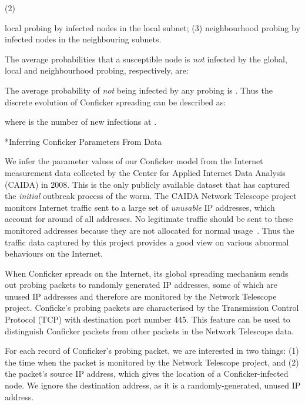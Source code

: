 \documentclass[9pt]{article}
\makeatletter
\renewcommand{\section}{\@startsection {section}{1}{0pt}{-6pt}{1pt}{\reset@font \large \bfseries}}
\makeatother
\begin{document}
(2) {local probing by  infected nodes in the local subnet; 
(3) {neighbourhood probing} by  infected nodes in the neighbouring subnets. 

The average probabilities that a susceptible node is \textit{not} infected by the global, local and neighbourhood probing, respectively, are: 

The average probability of \textit{not} being infected by any probing  is . Thus the discrete evolution of Conficker spreading can be described as: 

where  is the number of new infections at  .

\section*{Inferring Conficker Parameters From Data}

We infer the parameter values of our Conficker model from the Internet measurement data \cite{CAIDA_2008_aft, CAIDA_2008_bfr} collected by the Center for Applied Internet Data Analysis (CAIDA) in 2008. This is the only publicly available dataset that has captured the \textit{initial} outbreak process of the worm. The CAIDA Network Telescope project~\cite{CAIDA_2008_aft, CAIDA_2008_bfr} monitors Internet traffic sent to a large set of {\it unusable} IP addresses, which account for around  of all addresses.  No legitimate traffic should be sent to these monitored addresses because they are not allocated for normal usage~\cite{Emile_Aben_2009}. 
Thus the traffic data captured by this project provides a good view on various abnormal behaviours on the Internet.  

When Conficker spreads on the Internet, its global spreading mechanism sends out probing packets to randomly generated IP addresses, some of which are unused IP addresses and therefore are monitored by the Network Telescope project. 
Conficke's probing packets are characterised by the Transmission Control Protocol  (TCP) with destination port number 445. This feature can be used to distinguish Conficker packets from other packets in the Network Telescope data. 

For each record of Conficker's probing packet, we are interested in two things: (1) the time when the packet is monitored by the Network Telescope project, and (2) the packet's source IP address, which gives the location of a Conficker-infected node. 
We ignore the destination address, as it is a randomly-generated, unused IP address. 


}
\end{document}
